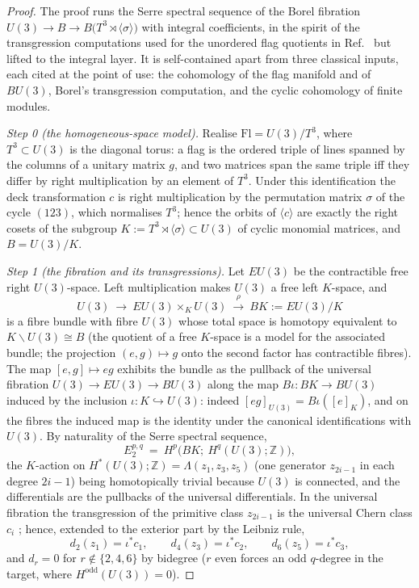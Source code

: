 \documentclass[11pt,a4paper]{article}
\begin{document}
\begin{proof}
The proof runs the Serre spectral sequence of the Borel fibration
$U(3)\to B\to B\bigl(T^3\rtimes\langle\sigma\rangle\bigr)$ with integral
coefficients, in the spirit of the transgression computations used for the
unordered flag quotients in Ref.~\cite{GuerraJana2025} but lifted to the
integral layer. It is self-contained apart from three classical inputs,
each cited at the point of use: the cohomology of the flag manifold and of
$BU(3)$, Borel's transgression computation, and the cyclic cohomology of
finite modules.

\emph{Step 0 (the homogeneous-space model).} Realise
$\mathrm{Fl}=U(3)/T^3$, where $T^3\subset U(3)$ is the diagonal torus: a
flag is the ordered triple of lines spanned by the columns of a unitary
matrix $g$, and two matrices span the same triple iff they differ by right
multiplication by an element of $T^3$. Under this identification the deck
transformation $c$ is right multiplication by the permutation matrix
$\sigma$ of the cycle $(123)$, which normalises $T^3$; hence the orbits of
$\langle c\rangle$ are exactly the right cosets of the subgroup
$K:=T^3\rtimes\langle\sigma\rangle\subset U(3)$ of cyclic monomial
matrices, and $B=U(3)/K$.

\emph{Step 1 (the fibration and its transgressions).} Let $EU(3)$ be the
contractible free right $U(3)$-space. Left multiplication makes $U(3)$ a
free left $K$-space, and
\[
U(3)\ \longrightarrow\ EU(3)\times_K U(3)\ \overset{\rho}{\longrightarrow}\
BK:=EU(3)/K
\]
is a fibre bundle with fibre $U(3)$ whose total space is homotopy equivalent
to $K\backslash U(3)\cong B$ (the quotient of a free $K$-space is a model
for the associated bundle; the projection $(e,g)\mapsto g$ onto the second
factor has contractible fibres). The map $[e,g]\mapsto eg$ exhibits the
bundle as the pullback of the universal fibration $U(3)\to EU(3)\to BU(3)$
along the map $B\iota\colon BK\to BU(3)$ induced by the inclusion
$\iota\colon K\hookrightarrow U(3)$: indeed $[eg]_{U(3)}=B\iota([e]_K)$, and
on the fibres the induced map is the identity under the canonical
identifications with $U(3)$. By naturality of the Serre spectral sequence,
\[
E_2^{p,q}\ =\ H^p\bigl(BK;\ H^q(U(3);\mathbb Z)\bigr),
\]
the $K$-action on $H^*(U(3);\mathbb Z)=\Lambda(z_1,z_3,z_5)$ (one generator
$z_{2i-1}$ in each degree $2i-1$) being homotopically trivial because $U(3)$
is connected, and the differentials are the pullbacks of the universal
differentials. In the universal fibration the transgression of the primitive
class $z_{2i-1}$ is the universal Chern class $c_i$
\cite{MilnorStasheff1974,HatcherSS}; hence, extended to the exterior part by
the Leibniz rule,
\[
d_2(z_1)=\iota^*c_1,\qquad d_4(z_3)=\iota^*c_2,\qquad d_6(z_5)=\iota^*c_3,
\]
and $d_r=0$ for $r\notin\{2,4,6\}$ by bidegree ($r$ even forces an odd
$q$-degree in the target, where $H^{\mathrm{odd}}(U(3))=0$).


\end{proof}
\end{document}
